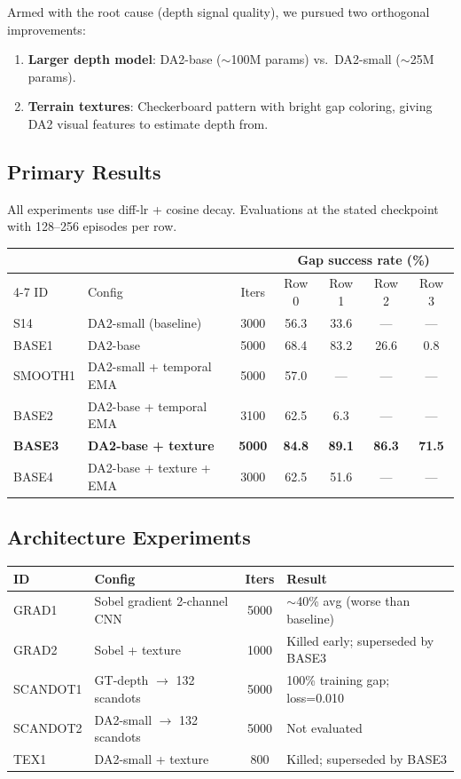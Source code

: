 \documentclass[11pt,a4paper]{article}
\newcommand{\best}[1]{\textcolor{best}{\textbf{#1}}}
\begin{document}
Armed with the root cause (depth signal quality), we pursued two orthogonal
improvements:
\begin{enumerate}[nosep]
  \item \textbf{Larger depth model}: DA2-base ($\sim$100M params) vs.\
        DA2-small ($\sim$25M params).
  \item \textbf{Terrain textures}: Checkerboard pattern with bright gap
        coloring, giving DA2 visual features to estimate depth from.
\end{enumerate}

\subsection{Primary Results}

All experiments use diff-lr + cosine decay.  Evaluations at the stated
checkpoint with 128--256 episodes per row.

\begin{center}
\begin{tabular}{l l c cccc}
\toprule
& & & \multicolumn{4}{c}{Gap success rate (\%)} \\
\cmidrule(lr){4-7}
ID & Config & Iters & Row 0 & Row 1 & Row 2 & Row 3 \\
\midrule
S14     & DA2-small (baseline)     & 3000 & 56.3 & 33.6 & --- & --- \\
\midrule
BASE1   & DA2-base                 & 5000 & 68.4 & 83.2 & 26.6 & 0.8 \\
SMOOTH1 & DA2-small + temporal EMA & 5000 & 57.0 & ---  & ---  & --- \\
BASE2   & DA2-base + temporal EMA  & 3100 & 62.5 & 6.3  & ---  & --- \\
\midrule
\best{BASE3} & \best{DA2-base + texture} & \best{5000} & \best{84.8} & \best{89.1} & \best{86.3} & \best{71.5} \\
BASE4   & DA2-base + texture + EMA & 3000 & 62.5 & 51.6 & ---  & --- \\
\bottomrule
\end{tabular}
\end{center}

\subsection{Architecture Experiments}

\begin{center}
\begin{tabular}{l l c l}
\toprule
ID & Config & Iters & Result \\
\midrule
GRAD1 & Sobel gradient 2-channel CNN & 5000 & $\sim$40\% avg (worse than baseline) \\
GRAD2 & Sobel + texture & 1000 & Killed early; superseded by BASE3 \\
SCANDOT1 & GT-depth $\to$ 132 scandots & 5000 & 100\% training gap; loss=0.010 \\
SCANDOT2 & DA2-small $\to$ 132 scandots & 5000 & Not evaluated \\
TEX1 & DA2-small + texture & 800 & Killed; superseded by BASE3 \\
\bottomrule
\end{tabular}
\end{center}
\end{document}
